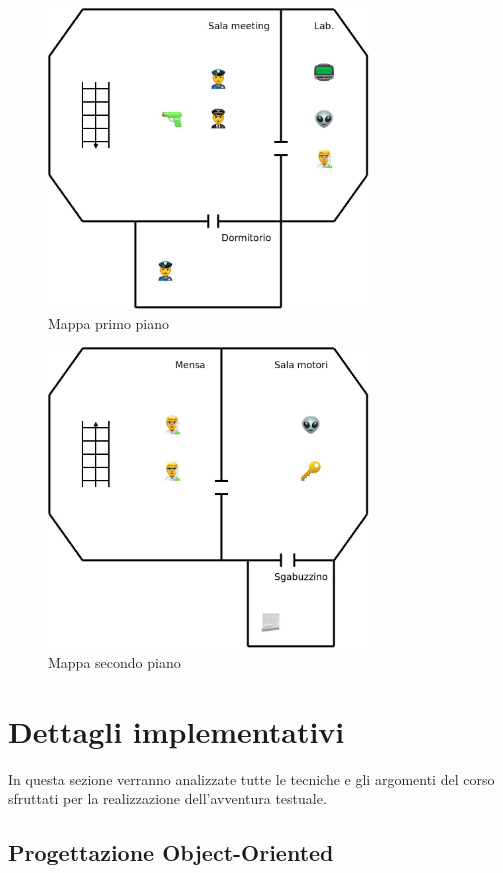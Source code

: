 \documentclass[italian,12pt,a4paper]{article}
\begin{document}
		\begin{figure}[!h]
			\centering
			\includegraphics[width=8.5cm]{map1.jpeg}
			\caption{Mappa primo piano}
			\label{fig:mappa_1}
		\end{figure}
		
		\begin{figure}[!h]
			\centering
			\includegraphics[width=8.5cm]{map2.jpeg}
			\caption{Mappa secondo piano}
			\label{fig:mappa_2}
		\end{figure}
		

\section{Dettagli implementativi}
	In questa sezione verranno analizzate tutte le tecniche e gli argomenti del corso sfruttati per la realizzazione dell'avventura testuale.
	
	\subsection{Progettazione Object-Oriented}
	
\end{document}
